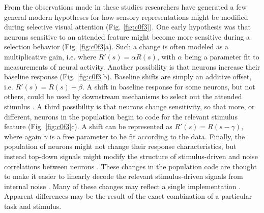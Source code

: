 From the observations made in these studies researchers have generated a few general modern hypotheses for how sensory representations might be modified during selective visual attention (Fig. \ref{fig:c0f3}). One early hypothesis was that neurons sensitive to an attended feature might become more sensitive during a selection behavior \citep{Reynolds2000-mg,Serences2007-le,Snyder2018-yr,Treue1999-mp} (Fig. \ref{fig:c0f3}a). Such a change is often modeled as a multiplicative gain, i.e. where $R'(s)=\alpha R(s)$, with $\alpha$ being a parameter fit to measurements of neural activity. Another possibility is that neurons increase their baseline response \citep{Buracas2007-pe,Chen2012-fu,Fang2008-ny,Kastner1999-qu,Li2008-fe} (Fig. \ref{fig:c0f3}b). Baseline shifts are simply an additive offset, i.e. $R'(s) = R(s) + \beta$. A shift in baseline response for some neurons, but not others, could be used by downstream mechanisms to select out the attended stimulus \citep{Pestilli2011-gi,Hara2014-mv}. A third possibility is that neurons change sensitivity, so that more, or different, neurons in the population begin to code for the relevant stimulus feature \citep{Cukur2013-gx,David2008-zx,Kastner1998-bi,Klein2014-oe,Spitzer1988-ib,Womelsdorf2006-np,Womelsdorf2008-bm} (Fig. \ref{fig:c0f3}c). A shift can be represented as $R'(s) = R(s-\gamma)$, where again $\gamma$ is a free parameter to be fit according to the data. Finally, the population of neurons might not change their response characteristics, but instead top-down signals might modify the structure of stimulus-driven and noise correlations between neurons \citep{Cohen2009-bt,Mitchell2009-do, Ruff2016-dv,Verhoef2017-cm}. These changes in the population code are thought to make it easier to linearly decode the relevant stimulus-driven signals from internal noise \citep{Snyder2018-yr,Ecker2016-ro,Rabinowitz2015-uz}. Many of these changes may reflect a single implementation \citep{Reynolds2009-kz}. Apparent differences may be the result of the exact combination of a particular task and stimulus. 

